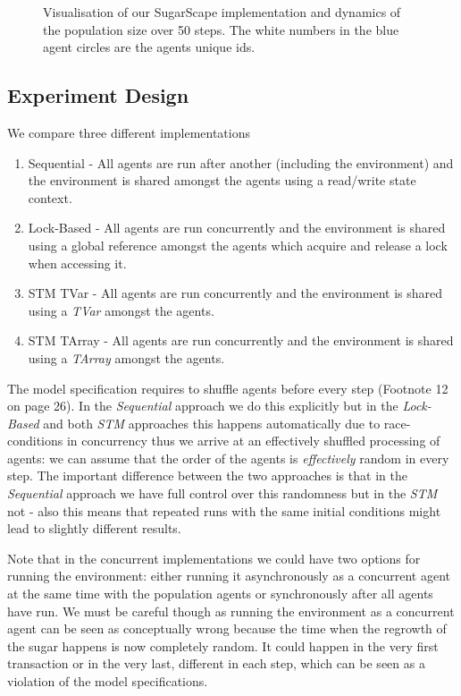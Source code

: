 \begin{figure}
\begin{center}
	\caption{Visualisation of our SugarScape implementation and dynamics of the population size over 50 steps. The white numbers in the blue agent circles are the agents unique ids.}
	\label{fig:vis_sugarscape}
\end{center}
\end{figure}

\subsection{Experiment Design}
We compare three different implementations

\begin{enumerate}
	\item Sequential - All agents are run after another (including the environment) and the environment is shared amongst the agents using a read/write state context.
	\item Lock-Based - All agents are run concurrently and the environment is shared using a global reference amongst the agents which acquire and release a lock when accessing it.
	\item STM TVar - All agents are run concurrently and the environment is shared using a \textit{TVar} amongst the agents.
	\item STM TArray - All agents are run concurrently and the environment is shared using a \textit{TArray} amongst the agents. 
\end{enumerate}

The model specification requires to shuffle agents before every step (Footnote 12 on page 26). In the \textit{Sequential} approach we do this explicitly but in the \textit{Lock-Based} and both \textit{STM} approaches this happens automatically due to race-conditions in concurrency thus we arrive at an effectively shuffled processing of agents: we can assume that the order of the agents is \textit{effectively} random in every step. The important difference between the two approaches is that in the \textit{Sequential} approach we have full control over this randomness but in the \textit{STM} not - also this means that repeated runs with the same initial conditions might lead to slightly different results.

Note that in the concurrent implementations we could have two options for running the environment: either running it asynchronously as a concurrent agent at the same time with the population agents or synchronously after all agents have run. We must be careful though as running the environment as a concurrent agent can be seen as conceptually wrong because the time when the regrowth of the sugar happens is now completely random. It could happen in the very first transaction or in the very last, different in each step, which can be seen as a violation of the model specifications.

